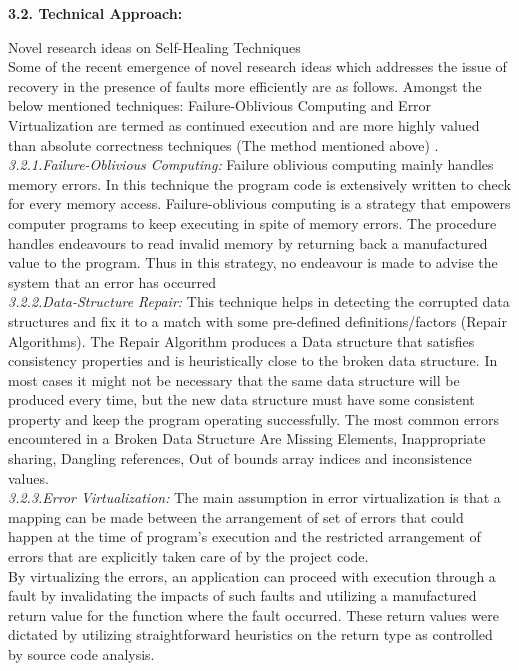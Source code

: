 \textbf{3.2. Technical Approach:\\}

Novel research ideas on Self-Healing Techniques\\

Some of the recent emergence of novel research ideas which addresses the issue of recovery in the presence of faults more efficiently are as follows. Amongst the below mentioned techniques: Failure-Oblivious Computing and Error Virtualization are termed as continued execution and are more highly valued than absolute correctness techniques (The method mentioned above)
\cite{Keromytis:SelfHealingSurvey:2011}.\\

\textit{3.2.1.Failure-Oblivious Computing:}
Failure oblivious computing mainly handles memory errors. In this technique the program code is extensively written to check for every memory access.
Failure-oblivious computing is a strategy that empowers computer programs to keep executing in spite of memory errors. The procedure handles endeavours to read invalid memory by returning back a manufactured value to the program. Thus in this strategy, no endeavour is made to advise the system that an error has occurred\\

\textit{3.2.2.Data-Structure Repair: }
This technique helps in detecting the corrupted data structures and fix it to a match with some pre-defined definitions/factors (Repair Algorithms). The Repair Algorithm produces a Data structure that satisfies consistency properties and is heuristically close to the broken data structure. In most cases it might not be necessary that the same data structure will be produced every time, but the new data structure must have some consistent property and keep the program operating successfully. The most common errors encountered in a Broken Data Structure Are Missing Elements, Inappropriate sharing, Dangling references, Out of bounds array indices and inconsistence values.\\
 
\textit{3.2.3.Error Virtualization: }
The main assumption in error virtualization is that a mapping can be made between the arrangement of set of errors that could happen at the time of program's execution and the restricted arrangement of errors that are explicitly taken care of by the project code.\\ 

By virtualizing the errors, an application can proceed with execution through a fault by invalidating the impacts of such faults and utilizing a manufactured return value for the function where the fault occurred. These return values were dictated by utilizing straightforward heuristics on the return type as controlled by source code analysis.\\

